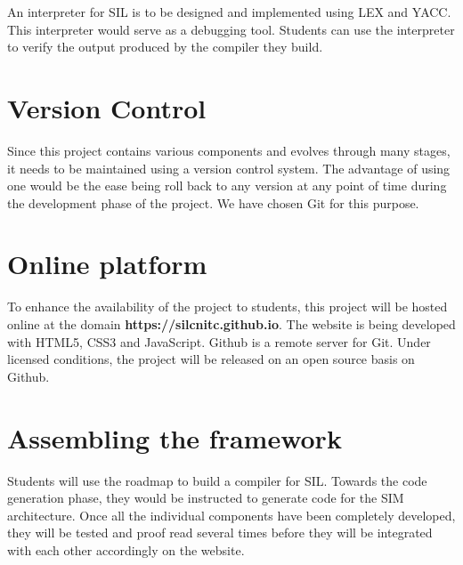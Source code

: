 An interpreter for SIL is to be designed and implemented using LEX and YACC. This interpreter would serve as a debugging tool. Students can use the interpreter to verify the output produced by the compiler they build.
   
\section{Version Control}
Since this project contains various components and evolves through many stages, it needs to be maintained using a version control system. The advantage of using one would be the ease being roll back to any version at any point of time during the development phase of the project. We have chosen Git for this purpose.

\section{Online platform}
To enhance the availability of the project to students, this project will be hosted online at the domain \textbf{https://silcnitc.github.io}. The website is being developed with HTML5, CSS3 and JavaScript. Github is a remote server for Git. Under licensed conditions, the project will be released on an open source basis on Github. 

\section{Assembling the framework}
Students will use the roadmap to build a compiler for SIL. Towards the code generation phase, they would be instructed to generate code for the SIM architecture\cite{citation-3-name-here}. Once all the individual components have been completely developed, they will be tested and proof read several times before they will be integrated with each other accordingly on the website.